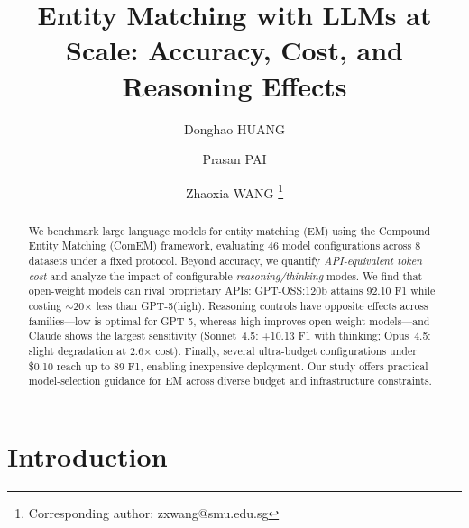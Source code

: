 \documentclass[runningheads]{llncs}
\begin{document}
\title{Entity Matching with LLMs at Scale: Accuracy, Cost, and Reasoning Effects}




\author{
Donghao HUANG
\and 
Prasan PAI
\and 
Zhaoxia WANG
\thanks{Corresponding author: zxwang@smu.edu.sg}
}

\maketitle

\begin{abstract}
We benchmark large language models for entity matching (EM) using the Compound Entity Matching (ComEM) framework, evaluating 46 model configurations across 8 datasets under a fixed protocol. Beyond accuracy, we quantify \emph{API-equivalent token cost} and analyze the impact of configurable \emph{reasoning/thinking} modes. We find that open-weight models can rival proprietary APIs: GPT-OSS:120b attains 92.10 F1 while costing $\sim$20$\times$ less than GPT-5(high). Reasoning controls have opposite effects across families---low is optimal for GPT-5, whereas high improves open-weight models---and Claude shows the largest sensitivity (Sonnet~4.5: +10.13 F1 with thinking; Opus~4.5: slight degradation at 2.6$\times$ cost). Finally, several ultra-budget configurations under \$0.10 reach up to 89 F1, enabling inexpensive deployment. Our study offers practical model-selection guidance for EM across diverse budget and infrastructure constraints.
\end{abstract}


\section{Introduction}
\end{document}
